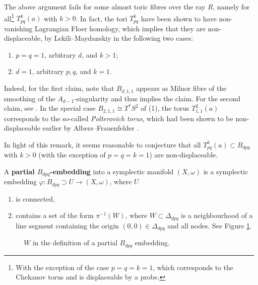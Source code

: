 \documentclass[12pt,a4paper,draft]{scrartcl}
\begin{document}
\begin{remark}
    The above argument fails for some almost toric fibres over the ray $R$, namely for all\footnote{With the exception of the case $p=q=k=1$, which corresponds to the Chekanov torus and is displaceable by a probe.} $T^k_{pq}(a)$ with $k > 0$.
In fact, the tori $T^k_{pq}$ have been shown to have non-vanishing Lagrangian Floer homology, which implies that they are non-displaceable, by Lekili--Maydanskiy \cite{LekMay14} in the following two cases:
    \begin{enumerate}
        \item $p = q = 1$, arbitrary $d$, and $k > 1$;
        \item $d = 1$, arbitrary $p,q$, and $k = 1$.
    \end{enumerate}
    Indeed, for the first claim, note that $B_{d,1,1}$ appears as Milnor fibre of the smoothing of the $A_{d-1}$-singularity and thus \cite[Proposition 2.20]{LekMay14} implies the claim.
For the second claim, see \cite[Proposition 3.6]{LekMay14}.
In the special case $B_{2,1,1} \cong T^*S^2$ of (1), the torus $T_{1,1}^2(a)$ corresponds to the so-called \emph{Polterovich torus}, which had been shown to be non-displaceable earlier by Albers--Frauenfelder \cite{AlbFra08}.
\end{remark}

In light of this remark, it seems reasonable to conjecture that all $T^k_{pq}(a) \subset B_{dpq}$ with $k > 0$ (with the exception of $p=q=k=1$) are non-displaceable.

\begin{definition}
    \label{def:partial_embedding}
    A \textbf{partial $B_{dpq}$-embedding} into a symplectic manifold $(X,\omega)$ is a symplectic embedding $φ:B_{dpq} ⊃ U → (X,ω)$, where $U$ 
    \begin{enumerate}
        \item is connected, 
        \item contains a set of the form $\pi^{-1}(W)$, where $W \subset \Delta_{dpq}$ is a neighbourhood of a line segment containing the origin $(0,0) \in \Delta_{dpq}$ and all nodes.
 See Figure \cref{fig:partial-Bdpq-embedding}.   
    \end{enumerate}
\end{definition}

\begin{figure}
    \centering
    \caption{$W$ in the definition of a partial $B_{dpq}$ embedding.}
    \label{fig:partial-Bdpq-embedding}
\end{figure}
\end{document}
